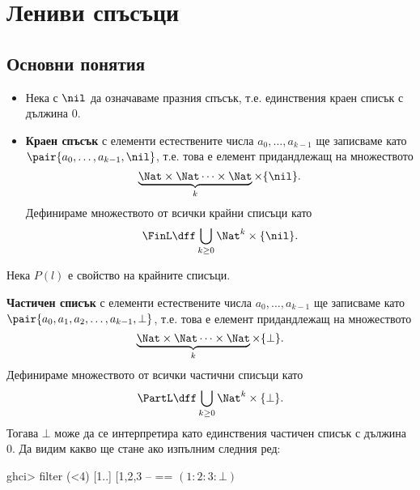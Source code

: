 \chapter{Лениви спъсъци}


\section{Основни понятия}
\begin{itemize}
\item
  Нека с $\nil$ да означаваме празния спъсък, т.е. единствения краен списък с дължина $0$.
\item
  {\bf Краен спъсък} с елементи естествените числа $a_0,\dots,a_{k-1}$
  ще записваме като $\pair{a_0,\dots,a_{k-1},\nil}$, т.е. това е елемент придандлежащ на множеството  
  \[\underbrace{\Nat \times \Nat \cdots \times \Nat}_{k} \times \{\nil\}.\]
  Дефинираме множеството от всички крайни списъци като
  \[\FinL \dff \bigcup_{k\geq 0} \Nat^k \times \{\nil\}.\]
\end{itemize}

Нека $P(l)$ е свойство на крайните списъци.
\begin{prooftree}
\end{prooftree}


{\bf Частичен списък} с елементи естествените числа $a_0,\dots,a_{k-1}$
ще записваме като $\pair{a_0,a_1,a_2,\dots,a_{k-1},\bot}$, т.е. това е елемент придандлежащ на множеството  
\[\underbrace{\Nat \times \Nat \cdots \times \Nat}_{k} \times \{\bot\}.\]
Дефинираме множеството от всички частични списъци като
\[\PartL \dff \bigcup_{k\geq 0} \Nat^k \times \{\bot\}.\]
Тогава $\bot$ може да се интерпретира като единствения частичен списък с дължина $0$.
Да видим какво ще стане ако изпълним следния ред:

\begin{haskellcode}
ghci> filter (<4) [1..]
[1,2,3                      -- == $(1:2:3:\bot)$
\end{haskellcode}
  
